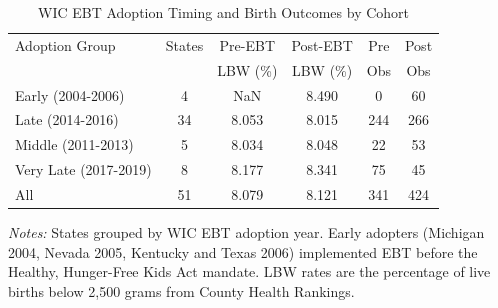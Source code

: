 \begin{table}[htbp]
\centering
\caption{WIC EBT Adoption Timing and Birth Outcomes by Cohort}
\label{tab:adoption}
\begin{tabular}{lccccc}
\hline\hline
Adoption Group & States & Pre-EBT & Post-EBT & Pre & Post \\
 & & LBW (\%) & LBW (\%) & Obs & Obs \\
\hline
Early (2004-2006) & 4 & NaN & 8.490 & 0 & 60 \\
Late (2014-2016) & 34 & 8.053 & 8.015 & 244 & 266 \\
Middle (2011-2013) & 5 & 8.034 & 8.048 & 22 & 53 \\
Very Late (2017-2019) & 8 & 8.177 & 8.341 & 75 & 45 \\
\hline
All & 51 & 8.079 & 8.121 & 341 & 424 \\
\hline\hline
\end{tabular}
\begin{tablenotes}[flushleft]
\small
\item \textit{Notes:} States grouped by WIC EBT adoption year. Early adopters (Michigan 2004, Nevada 2005, Kentucky and Texas 2006) implemented EBT before the Healthy, Hunger-Free Kids Act mandate. LBW rates are the percentage of live births below 2,500 grams from County Health Rankings.
\end{tablenotes}
\end{table}
